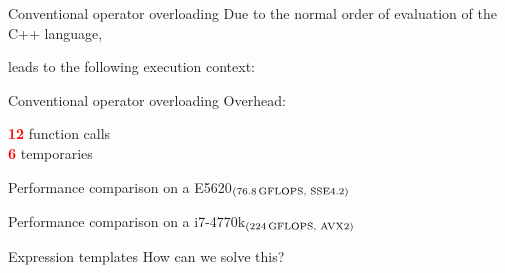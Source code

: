 \documentclass{beamer}
\begin{document}
\begin{frame}{Conventional operator overloading}
	Due to the normal order of evaluation of the C++ language,
	
	
	leads to the following execution context:
	
\end{frame}

\begin{frame}{Conventional operator overloading}
	Overhead: \\
	\begin{center}
		\textcolor{red}{\textbf{12}} function calls\\
		\textcolor{red}{\textbf{6}} temporaries
	\end{center}
\end{frame}

\begin{frame}{Performance comparison on a \small E5620$_{(\small76.8\,\text{GFLOPS, SSE4.2})}$} 
	
\end{frame}

\begin{frame}{Performance comparison on a \small i7-4770k$_{(\small224\,\text{GFLOPS, AVX2})}$} 
	
\end{frame}

\begin{frame}{Expression templates}
	How can we solve this?
\end{frame}
\end{document}
